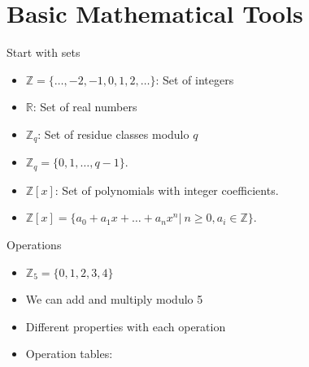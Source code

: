 \documentclass[ %
usenames,dvipsnames,
aspectratio=169,11pt]{beamer}
\newenvironment{stepitemize}{\begin{itemize}[<+->]}{\end{itemize} }
\newcommand{\Z}{\mathbb{Z}}
\newcommand{\R}{\mathbb{R}}
\begin{document}
\section{Basic Mathematical Tools}
\begin{frame}{Start with sets}
    \begin{stepitemize}
    \item $\Z=\{\dots, -2,-1,0,1,2,\dots \}$: Set of integers
    \item $\R$: Set of real numbers
    \item $\Z_q$: Set of residue classes modulo $q$
    \item $\Z_q=\{0,1,\dots,q-1\}$. 
    \item $\Z[x]$: Set of polynomials with integer coefficients.
    \item $\Z[x]=\{a_0+a_1x+\dots +a_nx^n| \: n\geq 0, a_i\in \Z\}.$
    \end{stepitemize}
\end{frame}

\begin{frame}{Operations}
\begin{stepitemize}
    \item  $\Z_5=\{0,1,2,3,4\}$
    \item We can add and multiply modulo 5
    \item Different properties with each operation
    \item Operation tables:
\end{stepitemize}    
\end{frame}
\end{document}
